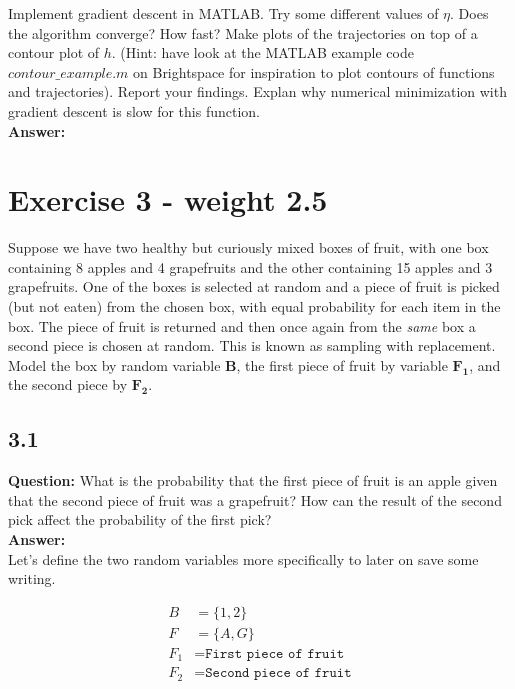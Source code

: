 \documentclass[a4paper]{article}
\begin{document}
Implement gradient descent in MATLAB. Try some different values of $\eta$. Does the algorithm converge? How fast? Make plots of the trajectories on top of a contour plot of $h$. (Hint: have look at the MATLAB example code $contour\_example.m$ on Brightspace for inspiration to plot contours of functions and trajectories). Report your findings. Explan why numerical minimization with gradient descent is slow for this function.\\

\textbf{Answer:}\\


\section*{Exercise 3 - weight 2.5}


Suppose we have two healthy but curiously mixed boxes of fruit, with one box containing 8 apples and 4 grapefruits and the other containing 15 apples and 3 grapefruits. One of the boxes is selected at random and a piece of fruit is picked (but not eaten) from the chosen box, with equal probability for each item in the box. The piece of fruit is returned and then once again from the \textit{same} box a second piece is chosen at random. This is known as sampling with replacement. Model the box by random variable $\boldsymbol{B}$, the first piece of fruit by variable $\boldsymbol{F_1}$, and the second piece by $\boldsymbol{F_2}$.


\subsection*{3.1}

\textbf{Question:} What is the probability that the first piece of fruit is an apple given that the second piece of fruit was a grapefruit? How can the result of the second pick affect the probability of the first pick?\\

\textbf{Answer:}\\

Let's define the two random variables more specifically to later on save some writing. 

\begin{align*}
	B &= \{ 1,2\}\\
	F &= \{ A,G \}\\
	F_1 &= \texttt{First piece of fruit}\\
	F_2 &= \texttt{Second piece of fruit}
\end{align*}
\end{document}
